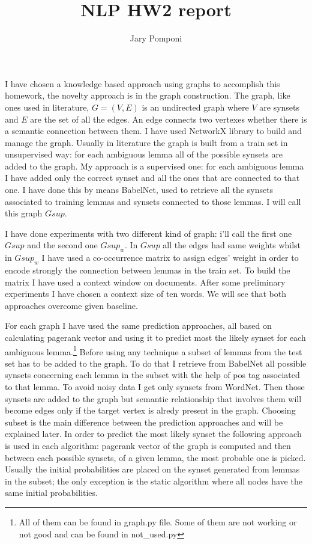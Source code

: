 \documentclass[0pt]{article}
\title{\small NLP HW2 report}
\author{\small Jary Pomponi}
\date{\vspace{-5ex}}
\begin{document}
\maketitle
	
I have chosen a knowledge based approach using graphs to accomplish this homework, the novelty approach is in the graph construction. The graph, like ones used in literature, $G = (V, E)$ is an undirected graph where $V$ are synsets and $E$ are the set of all the edges. An edge connects two vertexes whether there is a semantic connection between them. I have used NetworkX library to build and manage the graph. Usually in literature the graph is built from a train set in unsupervised way: for each ambiguous lemma all of the possible synsets are added to the graph. My approach is a supervised one: for each ambiguous lemma I have added only the correct synset and all the ones that are connected to that one. I have done this by means BabelNet, used to retrieve all the synsets associated to training lemmas and synsets connected to those lemmas. I will call this graph $Gsup$.

I have done experiments with two different kind of graph: i'll call the first one $Gsup$ and the second one $Gsup_{w}$. In $Gsup$ all the edges had same weights whilst in $Gsup_{w}$ I have used a co-occurrence matrix to assign edges' weight in order to encode strongly the connection between lemmas in the train set. To build the matrix I have used a context window on documents. After some preliminary experiments I have chosen a context size of ten words. We will see that both approaches overcome given baseline. 	

For each graph I have used the same prediction approaches, all based on calculating pagerank vector and using it to predict most the likely synset for each ambiguous lemma.\footnote{All of them can be found in graph.py file. Some of them are not working or not good and can be found in not\_used.py} Before using any technique a subset of lemmas from the test set has to be added to the graph. To do that I retrieve from BabelNet all possible synsets concerning each lemma in the subset with the help of pos tag associated to that lemma. To avoid noisy data I get only synsets from WordNet. Then those synsets are added to the graph but semantic relationship that involves them will become edges only if the target vertex is alredy present in the graph. Choosing subset is the main difference between the prediction approaches and will be explained later. In order to predict the most likely synset the following approach is used in each algorithm: pagerank vector of the graph is computed and then between each possible synsets, of a given lemma, the most probable one is picked. Usually the initial probabilities are placed on the synset generated from lemmas in the subset; the only exception is the static algorithm where all  nodes have the same initial probabilities. 
\end{document}
